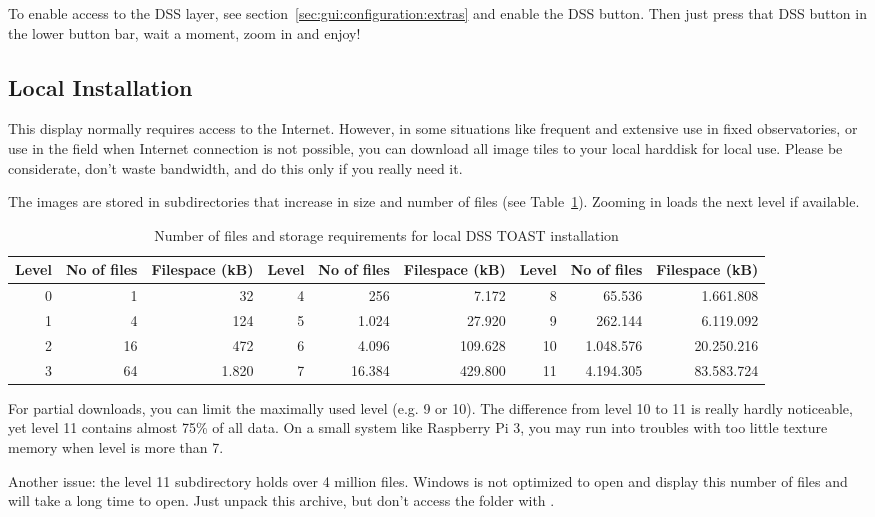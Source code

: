 To enable access to the DSS layer, see
section~\ref{sec:gui:configuration:extras} and enable the DSS
button. Then just press that DSS button in the lower button bar, wait
a moment, zoom in and enjoy!

\subsection{Local Installation}

This display normally requires access to the Internet. However, in
some situations like frequent and extensive use in fixed observatories,
or use in the field when Internet connection is not possible, you can
download all image tiles to your local harddisk for local use. Please be
considerate, don't waste bandwidth, and do this only if you really need it.

The images are stored in subdirectories that increase in size and
number of files (see Table~\ref{tab:TOAST:levels}). Zooming in loads
the next level if available.
\begin{table}[ht]
  \centering\scriptsize
\begin{tabular}{rrr|rrr|rrr}
Level & No of files & Filespace (kB)&Level & No of files & Filespace (kB)&Level & No of files & Filespace (kB)\\
\hline{}
0     &          1  &         32    &4     &        256  &      7.172    &8     &     65.536  &  1.661.808\\
1     &          4  &        124    &5     &      1.024  &     27.920    &9     &    262.144  &  6.119.092\\
2     &         16  &        472    &6     &      4.096  &    109.628    &10    &  1.048.576  & 20.250.216\\
3     &         64  &      1.820    &7     &     16.384  &    429.800    &11    &  4.194.305  & 83.583.724
\end{tabular}
\caption{Number of files and storage requirements for local DSS TOAST installation}
\label{tab:TOAST:levels}
\end{table}


For partial downloads, you can limit the maximally used level (e.g. 9
or 10). The difference from level 10 to 11 is really hardly
noticeable, yet level 11 contains almost 75\% of all data. On a small
system like Raspberry Pi 3, you may run into troubles with too little
texture memory when level is more than 7.

Another issue: the level 11 subdirectory holds over 4 million
files. Windows  is not optimized to open and display
this number of files and will take a long time to open. Just unpack
this archive, but don't access the folder with .

